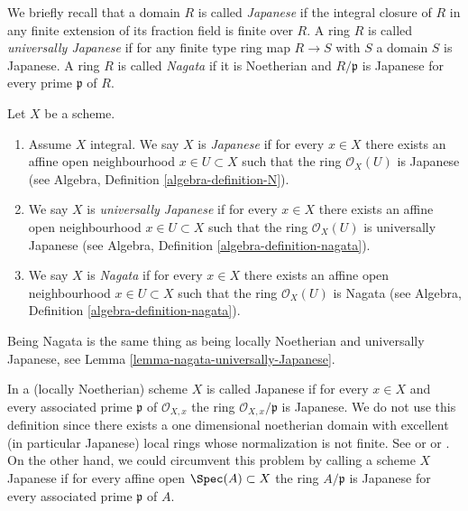 \medskip\noindent
We briefly recall that a domain $R$ is called {\it Japanese} if the integral
closure of $R$ in any finite extension of its fraction field is finite over
$R$. A ring $R$ is called {\it universally Japanese} if for any finite type
ring map $R \to S$ with $S$ a domain $S$ is Japanese. A ring $R$ is called
{\it Nagata} if it is Noetherian and $R/\mathfrak p$ is Japanese for every
prime $\mathfrak p$ of $R$.

\begin{definition}
\label{definition-nagata}
Let $X$ be a scheme.
\begin{enumerate}
\item Assume $X$ integral. We say $X$ is {\it Japanese}
if for every $x \in X$ there exists an
affine open neighbourhood $x \in U \subset X$ such that the ring
$\mathcal{O}_X(U)$ is Japanese (see
Algebra, Definition \ref{algebra-definition-N}).
\item We say $X$ is {\it universally Japanese} if for every $x \in X$
there exists an affine open neighbourhood $x \in U \subset X$ such that
the ring $\mathcal{O}_X(U)$ is universally Japanese (see
Algebra, Definition \ref{algebra-definition-nagata}).
\item We say $X$ is {\it Nagata} if for every $x \in X$ there exists an
affine open neighbourhood $x \in U \subset X$ such that the ring
$\mathcal{O}_X(U)$ is Nagata (see
Algebra, Definition \ref{algebra-definition-nagata}).
\end{enumerate}
\end{definition}

\noindent
Being Nagata is the same thing as being locally Noetherian
and universally Japanese, see
Lemma \ref{lemma-nagata-universally-Japanese}.

\begin{remark}
\label{remark-non-integral-Japanese}
In \cite{Hoobler-finite} a (locally Noetherian) scheme $X$ is called
Japanese if for every $x \in X$ and every associated prime $\mathfrak p$
of $\mathcal{O}_{X, x}$ the ring $\mathcal{O}_{X, x}/\mathfrak p$ is
Japanese. We do not use this definition since there exists a one
dimensional noetherian domain with excellent (in particular
Japanese) local rings whose normalization is not finite. See
\cite[Example 1]{Hochster-loci} or \cite{Heinzer-Levy} or
\cite[Expos\'e XIX]{Traveaux}.
On the other hand, we could circumvent this problem by calling a scheme
$X$ Japanese if for every affine open $\Spec(A) \subset X$ the ring
$A/\mathfrak p$ is Japanese for every associated prime $\mathfrak p$ of $A$.
\end{remark}

